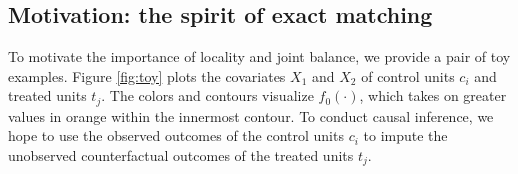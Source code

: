 \documentclass{article}
\begin{document}


\subsection{Motivation: the spirit of exact matching}
\label{sec:toy}

To motivate the importance of locality and joint balance, we provide a pair of toy examples.
Figure \ref{fig:toy} plots the covariates $X_1$ and $X_2$ of control units $c_i$ and treated units $t_j$.
The colors and contours visualize $f_0(\cdot)$, which takes on greater values in orange within the innermost contour.
To conduct causal inference, we hope to use the observed outcomes of the control units $c_i$ to impute the unobserved counterfactual outcomes of the treated units $t_j$.
\end{document}
